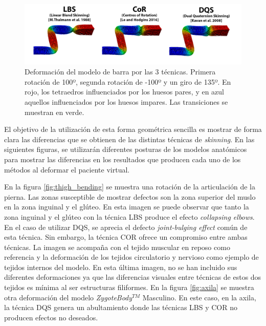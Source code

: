 \begin{figure}[ht]%
  \centering
  \includegraphics[width=\textwidth]{IMG/BarraCoR}
    \caption{Deformación del modelo de barra por las 3 técnicas. Primera rotación de 100º, segunda rotación de -100º y un giro de 135º. En rojo, los tetraedros influenciados por los huesos pares, y en azul aquellos influenciados por los huesos impares. Las transiciones se muestran en verde.}
    \label{fig:bar_bending}
\end{figure}

El objetivo de la utilización de esta forma geométrica sencilla es mostrar de forma clara las diferencias que se obtienen de las distintas técnicas de \emph{skinning}. %
En las siguientes figuras, se utilizarán diferentes posturas de los modelos anatómicos para mostrar las diferencias en los resultados que producen cada uno de los métodos al deformar el paciente virtual.

En la figura \ref{fig:thigh_bending} se muestra una rotación de la articulación de la pierna. Las zonas susceptible de mostrar defectos son la zona superior del muslo en la zona inguinal y el glúteo. En esta imagen se puede observar que tanto la zona inguinal y el glúteo con la técnica \ac{LBS} produce el efecto \emph{collapsing elbows}. En el caso de utilizar \ac{DQS}, se aprecia el defecto \emph{joint-bulging effect} común de esta técnica. Sin embargo, la técnica \ac{COR} ofrece un compromiso entre ambas técnicas. La imagen se acompaña con el tejido muscular en reposo como referencia y la deformación de los tejidos circulatorio y nervioso como ejemplo de tejidos internos del modelo. En esta última imagen, no se han incluido sus diferentes deformaciones ya que las diferencias visuales entre técnicas de estos dos tejidos es mínima al ser estructuras filiformes. En la figura \ref{fig:axila} se muestra otra deformación del modelo \emph{ZygoteBody}$^{TM}$ Masculino. En este caso, en la axila, la técnica \ac{DQS} genera un abultamiento donde las técnicas \ac{LBS} y \ac{COR} no producen efectos no deseados.



